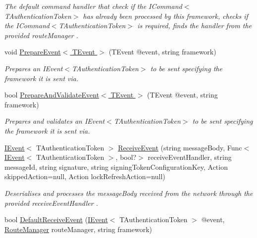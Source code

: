 \begin{DoxyCompactItemize}
\begin{DoxyCompactList}\small\item\em The default command handler that check if the I\+Command$<$\+T\+Authentication\+Token$>$ has already been processed by this framework, checks if the I\+Command$<$\+T\+Authentication\+Token$>$ is required, finds the handler from the provided {\itshape route\+Manager} . \end{DoxyCompactList}\item 
void \hyperlink{interfaceCqrs_1_1Azure_1_1ServiceBus_1_1IAzureBusHelper_ab7d1fa5162adc0f01edcf9039bb43c2c_ab7d1fa5162adc0f01edcf9039bb43c2c}{Prepare\+Event$<$ T\+Event $>$} (T\+Event @event, string framework)
\begin{DoxyCompactList}\small\item\em Prepares an I\+Event$<$\+T\+Authentication\+Token$>$ to be sent specifying the framework it is sent via. \end{DoxyCompactList}\item 
bool \hyperlink{interfaceCqrs_1_1Azure_1_1ServiceBus_1_1IAzureBusHelper_ac5cbeb6e8bbdb1a98501f0b746c12abd_ac5cbeb6e8bbdb1a98501f0b746c12abd}{Prepare\+And\+Validate\+Event$<$ T\+Event $>$} (T\+Event @event, string framework)
\begin{DoxyCompactList}\small\item\em Prepares and validates an I\+Event$<$\+T\+Authentication\+Token$>$ to be sent specifying the framework it is sent via. \end{DoxyCompactList}\item 
\hyperlink{interfaceCqrs_1_1Events_1_1IEvent}{I\+Event}$<$ T\+Authentication\+Token $>$ \hyperlink{interfaceCqrs_1_1Azure_1_1ServiceBus_1_1IAzureBusHelper_abca50d70da26664a7f2ff26b4059c903_abca50d70da26664a7f2ff26b4059c903}{Receive\+Event} (string message\+Body, Func$<$ \hyperlink{interfaceCqrs_1_1Events_1_1IEvent}{I\+Event}$<$ T\+Authentication\+Token $>$, bool?$>$ receive\+Event\+Handler, string message\+Id, string signature, string signing\+Token\+Configuration\+Key, Action skipped\+Action=null, Action lock\+Refresh\+Action=null)
\begin{DoxyCompactList}\small\item\em Deserialises and processes the {\itshape message\+Body}  received from the network through the provided {\itshape receive\+Event\+Handler} . \end{DoxyCompactList}\item 
bool \hyperlink{interfaceCqrs_1_1Azure_1_1ServiceBus_1_1IAzureBusHelper_a29758e82b2fd6c7e3ed6b19547887db9_a29758e82b2fd6c7e3ed6b19547887db9}{Default\+Receive\+Event} (\hyperlink{interfaceCqrs_1_1Events_1_1IEvent}{I\+Event}$<$ T\+Authentication\+Token $>$ @event, \hyperlink{classCqrs_1_1Bus_1_1RouteManager}{Route\+Manager} route\+Manager, string framework)

\end{DoxyCompactItemize}
